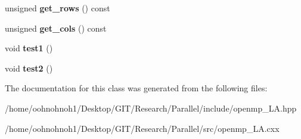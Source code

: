 \begin{DoxyCompactItemize}
\item 
\mbox{\label{classSYN__Mat_af5ad6b2b5195b2b639699969ee2cdd8f}} 
unsigned {\bfseries get\+\_\+rows} () const
\item 
\mbox{\label{classSYN__Mat_a81c260deeb47134793364247264afc71}} 
unsigned {\bfseries get\+\_\+cols} () const
\item 
\mbox{\label{classSYN__Mat_afa91166dde91f354a19feb41517abee9}} 
void {\bfseries test1} ()
\item 
\mbox{\label{classSYN__Mat_a1d8c9032adf3c2aaf106081336a56950}} 
void {\bfseries test2} ()
\end{DoxyCompactItemize}


The documentation for this class was generated from the following files\+:\begin{DoxyCompactItemize}
\item 
/home/oohnohnoh1/\+Desktop/\+G\+I\+T/\+Research/\+Parallel/include/openmp\+\_\+\+L\+A.\+hpp\item 
/home/oohnohnoh1/\+Desktop/\+G\+I\+T/\+Research/\+Parallel/src/openmp\+\_\+\+L\+A.\+cxx\end{DoxyCompactItemize}
